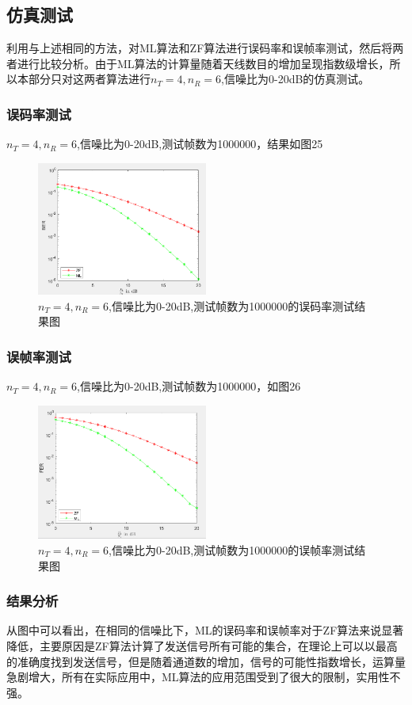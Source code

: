 \documentclass[a4paper,12pt]{article}
\begin{document}
	\subsection{仿真测试}
	利用与上述相同的方法，对ML算法和ZF算法进行误码率和误帧率测试，然后将两者进行比较分析。由于ML算法的计算量随着天线数目的增加呈现指数级增长，所以本部分只对这两者算法进行$n_T=4,n_R=6$,信噪比为0-20dB的仿真测试。
	\subsubsection{误码率测试}
	 $n_T=4,n_R=6$,信噪比为0-20dB,测试帧数为1000000，结果如图25
		\begin{figure}[h]
			\centering
			\includegraphics[width=0.5\textwidth]{26.png}
			\caption{$n_T=4,n_R=6$,信噪比为0-20dB,测试帧数为1000000的误码率测试结果图}
		\end{figure}
	\subsubsection{误帧率测试}
		$n_T=4,n_R=6$,信噪比为0-20dB,测试帧数为1000000，如图26
		\begin{figure}[h]			
			\centering
			\includegraphics[width=0.5\textwidth]{27.png}
			\caption{$n_T=4,n_R=6$,信噪比为0-20dB,测试帧数为1000000的误帧率测试结果图}
		\end{figure}
	\subsubsection{结果分析}
	从图中可以看出，在相同的信噪比下，ML的误码率和误帧率对于ZF算法来说显著降低，主要原因是ZF算法计算了发送信号所有可能的集合，在理论上可以以最高的准确度找到发送信号，但是随着通道数的增加，信号的可能性指数增长，运算量急剧增大，所有在实际应用中，ML算法的应用范围受到了很大的限制，实用性不强。
\end{document}
